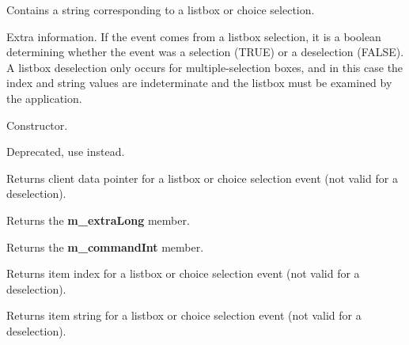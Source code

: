 

Contains a string corresponding to a listbox or choice selection.



Extra information. If the event comes from a listbox selection, it is
a boolean determining whether the event was a selection (TRUE) or a
deselection (FALSE). A listbox deselection only occurs for
multiple-selection boxes, and in this case the index and string values
are indeterminate and the listbox must be examined by the application.



Constructor.



Deprecated, use  instead.



Returns client data pointer for a listbox or choice selection event
(not valid for a deselection).



Returns the {\bf m\_extraLong} member.



Returns the {\bf m\_commandInt} member.



Returns item index for a listbox or choice selection event (not valid for
a deselection).



Returns item string for a listbox or choice selection event (not valid for
a deselection).

